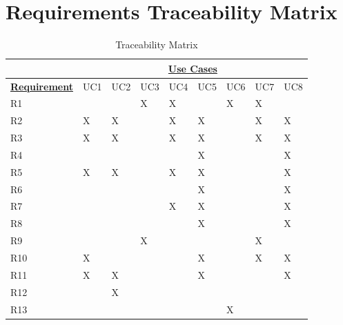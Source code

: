 \documentclass[a4paper, 12pt, one column, aas_macros]{article}
\begin{document}
\section{Requirements Traceability Matrix}
\useunder{\uline}{\ul}{}
\begin{table}[H]
	\centering
	\caption{Traceability Matrix}
	\begin{tabular}{l|l|l|l|l|l|l|l|l|}
		\cline{2-9}
		                                                 & \multicolumn{8}{c|}{{\ul \textbf{Use Cases}}} \\ \hline
		\multicolumn{1}{|l|}{{\ul \textbf{Requirement}}} & UC1 & UC2 & UC3 & UC4 & UC5 & UC6 & UC7 & UC8 \\ \hline
		\multicolumn{1}{|l|}{R1}                         &     &     & X   & X   &     & X   & X   &     \\ \hline
		\multicolumn{1}{|l|}{R2}                         & X   & X   &     & X   & X   &     & X   & X   \\ \hline
		\multicolumn{1}{|l|}{R3}                         & X   & X   &     & X   & X   &     & X   & X   \\ \hline
		\multicolumn{1}{|l|}{R4}                         &     &     &     &     & X   &     &     & X   \\ \hline
		\multicolumn{1}{|l|}{R5}                         & X   & X   &     & X   & X   &     &     & X   \\ \hline
		\multicolumn{1}{|l|}{R6}                         &     &     &     &     & X   &     &     & X   \\ \hline
		\multicolumn{1}{|l|}{R7}                         &     &     &     & X   & X   &     &     & X   \\ \hline
		\multicolumn{1}{|l|}{R8}                         &     &     &     &     & X   &     &     & X   \\ \hline
		\multicolumn{1}{|l|}{R9}                         &     &     & X   &     &     &     & X   &     \\ \hline
		\multicolumn{1}{|l|}{R10}                        & X   &     &     &     & X   &     & X   & X   \\ \hline
		\multicolumn{1}{|l|}{R11}                        & X   & X   &     &     & X   &     &     & X   \\ \hline
		\multicolumn{1}{|l|}{R12}                        &     & X   &     &     &     &     &     &     \\ \hline
		\multicolumn{1}{|l|}{R13}                        &     &     &     &     &     & X   &     &     \\ \hline
	\end{tabular}
\end{table}
\newpage
\end{document}
